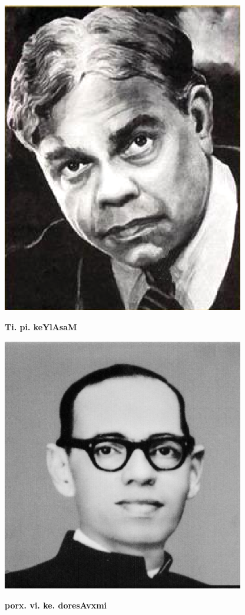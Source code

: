 \begin{minipage}[r]{4cm}
  \centering\includegraphics[scale=0.8]{src/figures/t_p_kailasam.eps}
   
  {\bf Ti. pi. keYlAsaM}
  \end{minipage}
  \qquad 
\begin{minipage}[l]{5cm}
  \centering\includegraphics[scale=0.8]{src/figures/v_k_doreswamy.eps}
   
  {\bf porx. vi. ke. doresAvxmi}
  \end{minipage}
    

